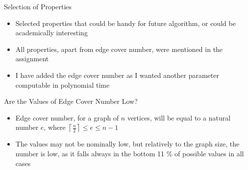 \documentclass{beamer}
\begin{document}
\begin{frame}{Selection of Properties}
    \begin{itemize}
        \item Selected properties that could be handy for future algorithm, or could be academically interesting
        \item All properties, apart from edge cover number, were mentioned in the assignment
        \item I have added the edge cover number as I wanted another parameter computable in polynomial time
    \end{itemize}
\end{frame}

\begin{frame}{Are the Values of Edge Cover Number Low?}
    \begin{itemize}
        \item Edge cover number, for a graph of $n$ vertices, will be equal to a natural number $e$, where $\left \lceil{\frac{n}{2}}\right \rceil  \leq e \leq n - 1$
        \item The values may not be nominally low, but relatively to the graph size, the number is low, as it falls always in the bottom 11 \% of possible values in all cases
    \end{itemize}
\begin{table}[h!]
\centering
{}
\end{table}
\end{frame}
\end{document}
